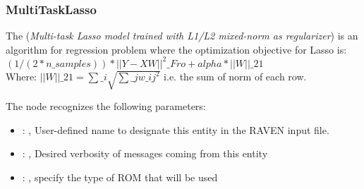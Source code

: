 \subsubsection{MultiTaskLasso}
  The  (\textit{Multi-task Lasso model trained                         with
  L1/L2 mixed-norm as regularizer}) is an algorithm for regression problem
  where the optimization objective for Lasso is:                         $(1 / (2 * n\_samples)) *
  ||Y - XW||^2\_{Fro} + alpha * ||W||\_{21}$                         \\Where:
  $||W||\_{21} = \sum\_i \sqrt{\sum\_j w\_{ij}^2}$                         i.e. the sum of norm of each
  row.                         

  The  node recognizes the following parameters:
    \begin{itemize}
      \item {}: , 
        User-defined name to designate this entity in the RAVEN input file.
      \item {}: , 
        Desired verbosity of messages coming from this entity
      \item {}: , 
        specify the type of ROM that will be used
  \end{itemize}

